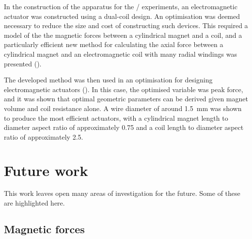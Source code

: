 \documentclass[10pt,a4paper]{memoir}
\begin{document}
In the construction of the apparatus for the \qzs/ experiments, an electromagnetic actuator was constructed using a dual-coil design.
An optimisation was deemed necessary to reduce the size and cost of constructing such devices.
This required a model of the the magnetic forces between a cylindrical magnet and a coil, and a particularly efficient new method for calculating the axial force between a cylindrical magnet and an electromagnetic coil with many radial windings was presented ().

The developed method was then used in an optimisation for designing electromagnetic actuators ().
In this case, the optimised variable was peak force, and it was shown that optimal geometric parameters can be derived given magnet volume and coil resistance alone.
A wire diameter of around \SI{1.5}{mm} was shown to produce the most efficient actuators, with a cylindrical magnet length to diameter aspect ratio of approximately \num{0.75} and a coil length to diameter aspect ratio of approximately \num{2.5}.

\section{Future work}

This work leaves open many areas of investigation for the future.
Some of these are highlighted here.

\subsection{Magnetic forces}
\end{document}
